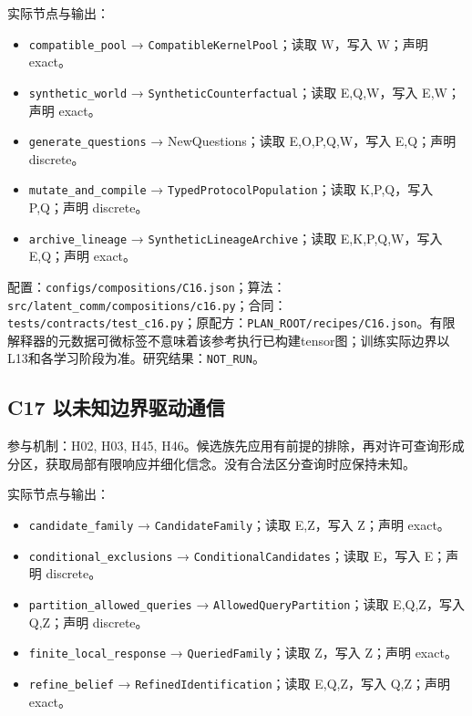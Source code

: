 \documentclass[
  10pt,
]{article}
\begin{document}
实际节点与输出：

\begin{itemize}
\item
  \nolinkurl{compatible_pool} → \nolinkurl{CompatibleKernelPool}；读取
  W，写入 W；声明 exact。
\item
  \nolinkurl{synthetic_world} →
  \nolinkurl{SyntheticCounterfactual}；读取 E,Q,W，写入 E,W；声明
  exact。
\item
  \nolinkurl{generate_questions} → NewQuestions；读取 E,O,P,Q,W，写入
  E,Q；声明 discrete。
\item
  \nolinkurl{mutate_and_compile} →
  \nolinkurl{TypedProtocolPopulation}；读取 K,P,Q，写入 P,Q；声明
  discrete。
\item
  \nolinkurl{archive_lineage} →
  \nolinkurl{SyntheticLineageArchive}；读取 E,K,P,Q,W，写入 E,Q；声明
  exact。
\end{itemize}

配置：{\small\nolinkurl{configs/compositions/C16.json}}；算法：{\small\nolinkurl{src/latent_comm/compositions/c16.py}}；合同：{\small\nolinkurl{tests/contracts/test_c16.py}}；原配方：{\small\nolinkurl{PLAN_ROOT/recipes/C16.json}}。有限解释器的元数据可微标签不意味着该参考执行已构建tensor图；训练实际边界以L13和各学习阶段为准。研究结果：\nolinkurl{NOT_RUN}。

\subsection{C17
以未知边界驱动通信}\label{c17-ux4ee5ux672aux77e5ux8fb9ux754cux9a71ux52a8ux901aux4fe1}

参与机制：H02, H03, H45,
H46。候选族先应用有前提的排除，再对许可查询形成分区，获取局部有限响应并细化信念。没有合法区分查询时应保持未知。

实际节点与输出：

\begin{itemize}
\item
  \nolinkurl{candidate_family} → \nolinkurl{CandidateFamily}；读取
  E,Z，写入 Z；声明 exact。
\item
  \nolinkurl{conditional_exclusions} →
  \nolinkurl{ConditionalCandidates}；读取 E，写入 E；声明 discrete。
\item
  \nolinkurl{partition_allowed_queries} →
  \nolinkurl{AllowedQueryPartition}；读取 E,Q,Z，写入 Q,Z；声明
  discrete。
\item
  \nolinkurl{finite_local_response} → \nolinkurl{QueriedFamily}；读取
  Z，写入 Z；声明 exact。
\item
  \nolinkurl{refine_belief} → \nolinkurl{RefinedIdentification}；读取
  E,Q,Z，写入 Q,Z；声明 exact。
\end{itemize}
\end{document}
